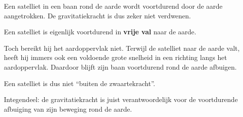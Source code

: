 \documentclass{ximera}
\begin{document}
Een satelliet in een baan rond de aarde wordt voortdurend door de
aarde aangetrokken. De gravitatiekracht is dus zeker niet verdwenen.

Een satelliet is eigenlijk voortdurend in \textbf{vrije val} naar de
aarde.

Toch bereikt hij het aardoppervlak niet. Terwijl de satelliet naar de
aarde valt, heeft hij immers ook een voldoende grote snelheid in een
richting langs het aardoppervlak. Daardoor blijft zijn baan voortdurend
rond de aarde afbuigen.

\begin{opmerking}
Een satelliet is dus niet ``buiten de zwaartekracht''.

Integendeel: de gravitatiekracht is juist verantwoordelijk voor de
voortdurende afbuiging van zijn beweging rond de aarde.
\end{opmerking}
\end{document}

